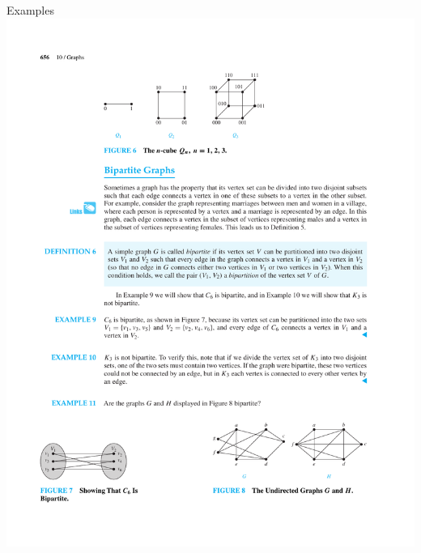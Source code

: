 \documentclass{beamer}
\theoremstyle{definition}
\begin{document}
\begin{frame}{Examples}
    \centering \includegraphics[trim={10cm 3.2cm 2cm 21cm}, clip, width=.9\linewidth]{p656}
\end{frame}
\end{document}
